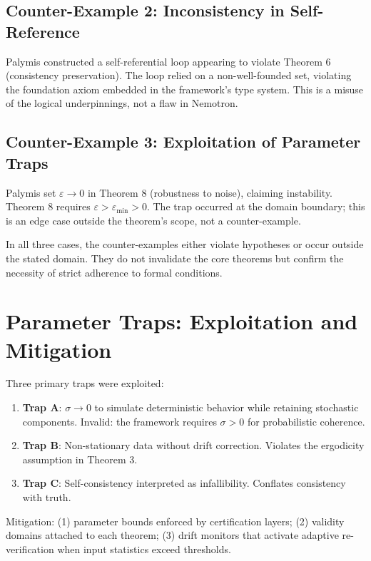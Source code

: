 \documentclass[11pt]{article}
\theoremstyle{definition}
\begin{document}
\subsection{Counter-Example 2: Inconsistency in Self-Reference}

Palymis constructed a self-referential loop appearing to violate Theorem 6 (consistency
preservation). The loop relied on a non-well-founded set, violating the foundation axiom
embedded in the framework's type system. This is a misuse of the logical underpinnings,
not a flaw in Nemotron.

\subsection{Counter-Example 3: Exploitation of Parameter Traps}

Palymis set $\varepsilon \to 0$ in Theorem 8 (robustness to noise), claiming instability.
Theorem 8 requires $\varepsilon > \varepsilon_{\min} > 0$. The trap occurred at the domain
boundary; this is an edge case outside the theorem's scope, not a counter-example.

In all three cases, the counter-examples either violate hypotheses or occur outside the
stated domain. They do not invalidate the core theorems but confirm the necessity of strict
adherence to formal conditions.

\section{Parameter Traps: Exploitation and Mitigation}
\label{sec:traps}

Three primary traps were exploited:
\begin{enumerate}[label=\arabic*.]
\item \textbf{Trap A}: $\sigma \to 0$ to simulate deterministic behavior while retaining
stochastic components. Invalid: the framework requires $\sigma > 0$ for probabilistic
coherence.
\item \textbf{Trap B}: Non-stationary data without drift correction. Violates the ergodicity
assumption in Theorem 3.
\item \textbf{Trap C}: Self-consistency interpreted as infallibility. Conflates consistency
with truth.
\end{enumerate}

Mitigation: (1) parameter bounds enforced by certification layers; (2) validity domains
attached to each theorem; (3) drift monitors that activate adaptive re-verification when
input statistics exceed thresholds.
\end{document}
